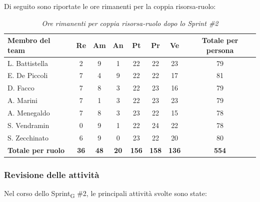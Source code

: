 \documentclass[a4paper, 10pt, colorlinks=true, linkcolor=black, urlcolor=blue, citecolor=blue, hidelinks]{article}
\renewcommand{\arraystretch}{1.2}
\begin{document}
Di seguito sono riportate le ore rimanenti per la coppia risorsa-ruolo:

\begin{table}[H]
    \centering
    \renewcommand{\arraystretch}{1.4}
    \begin{tabular}{|l|c|c|c|c|c|c|c|}
        \hline
        \rowcolor{bluBitless!15}
        \textbf{Membro del team} & \textbf{Re} & \textbf{Am} & \textbf{An} & \textbf{Pt} & \textbf{Pr} & \textbf{Ve} & \textbf{Totale per persona} \\
        \hline
        L. Battistella & 2 & 9 & 1 & 22 & 22 & 23 & 79 \\ \hline
        E. De Piccoli & 7 & 4 & 9 & 22 & 22 & 17 & 81 \\ \hline
        D. Facco & 7 & 8 & 3 & 22 & 23 & 16 & 79 \\ \hline
        A. Marini & 7 & 1 & 3 & 22 & 23 & 23 & 79 \\ \hline
        A. Menegaldo & 7 & 8 & 3 & 23 & 22 & 15 & 78 \\ \hline
        S. Vendramin & 0 & 9 & 1 & 22 & 24 & 22 & 78 \\ \hline
        S. Zecchinato & 6 & 9 & 0 & 23 & 22 & 20 & 80 \\ \hline
        \rowcolor{bluBitless!8}
        \textbf{Totale per ruolo} & \textbf{36} & \textbf{48} & \textbf{20} & \textbf{156} & \textbf{158} & \textbf{136} & \textbf{554} \\
        \hline
    \end{tabular}
    \caption{\textit{Ore rimanenti per coppia risorsa-ruolo dopo lo Sprint \#2}}
\end{table}

\subsubsection{Revisione delle attività}
Nel corso dello Sprint\textsubscript{G} \#2, le principali attività svolte sono state:
\end{document}
